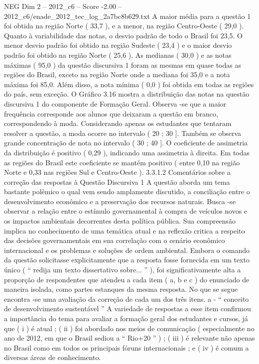 \begin{textsample}{NEG Dim 2 – 2012\_c6 – Score -2.00 – 2012\_c6/enade\_2012\_tec\_log\_2a7bc8b629.txt}
A maior média para a questão 1 foi obtida na região Norte ( 33,7 ), e a menor, na região Centro-Oeste ( 29,0 ).
Quanto à variabilidade das notas, o desvio padrão de todo o Brasil foi 23,5.
O menor desvio padrão foi obtido na região Sudeste ( 23,4 ) e o maior desvio padrão foi obtido na região Norte ( 25,6 ).
As medianas ( 30,0 ) e as notas máximas ( 95,0 ) da questão discursiva 1 foram as mesmas em quase todas as regiões do Brasil, exceto na região Norte onde a mediana foi 35,0 e a nota máxima foi 85,0.
Além disso, a nota mínima ( 0,0 ) foi obtida em todas as regiões do país, sem exceção.
O Gráfico 3.16 mostra a distribuição das notas na questão discursiva 1 do componente de Formação Geral.
Observa -se que a maior frequência corresponde aos alunos que deixaram a questão em branco, correspondendo à moda.
Considerando apenas os estudantes que tentaram resolver a questão, a moda ocorre no intervalo ( 20 ; 30 ].
Também se observa grande concentração de nota no intervalo ( 30 ; 40 ].
O coeficiente de assimetria da distribuição é positivo ( 0,29 ), indicando uma assimetria à direita.
Em todas as regiões do Brasil este coeficiente se mantém positivo ( entre 0,10 na região Norte e 0,33 nas regiões Sul e Centro-Oeste ). 3.3.1.2 Comentários sobre a correção das respostas à Questão Discursiva 1 A questão aborda um tema bastante polêmico o qual vem sendo amplamente discutido, a conciliação entre o desenvolvimento econômico e a preservação dos recursos naturais.
Busca -se observar a relação entre o estímulo governamental à compra de veículos novos e os impactos ambientais decorrentes desta política pública.
Sua compreensão implica no conhecimento de uma temática atual e na reflexão critica a respeito das decisões governamentais em sua correlação com o cenário econômico internacional e os problemas e soluções de ordem ambiental.
Embora o comando da questão solicitasse explicitamente que a resposta fosse fornecida em um texto único ( “ redija um texto dissertativo sobre... ” ), foi significativamente alta a proporção de respondentes que atendeu a cada item ( a, b e c ) do enunciado de maneira isolada, como partes estanques da mesma resposta.
No que se segue encontra -se uma avaliação da correção de cada um dos três itens. a - “ conceito de desenvolvimento sustentável ” A variedade de respostas a esse item confirmou a importância do tema para avaliar a formação geral dos estudantes e cursos, já que ( i ) é atual ; ( ii ) foi abordado nos meios de comunicação ( especialmente no ano de 2012, em que o Brasil sediou a “ Rio+20 ” ) ; ( iii ) é relevante não apenas no Brasil como em todos os principais fóruns internacionais ; e ( iv ) é comum a diversas áreas de conhecimento.

\end{textsample}
